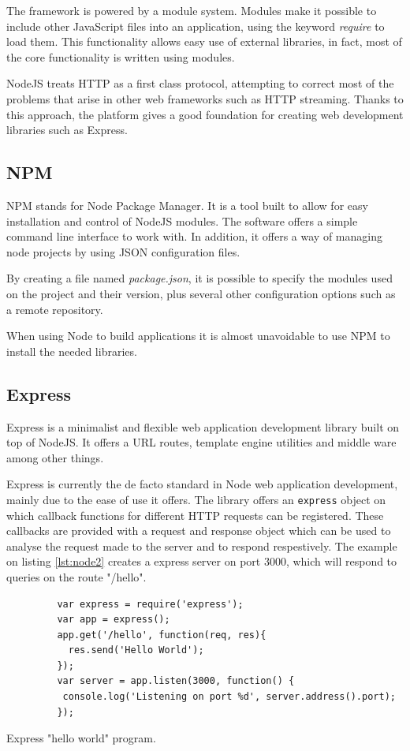 The framework is powered by a module system. Modules make it possible to include other JavaScript files into an application, using the keyword \textit{require} to load them. This functionality allows easy use of external libraries, in fact, most of the core functionality is written using modules.

NodeJS treats HTTP as a first class protocol, attempting to correct most of the problems that arise in other web frameworks such as HTTP streaming. Thanks to this approach, the platform gives a good foundation for creating web development libraries such as Express.

\subsection*{NPM}

NPM stands for Node Package Manager. It is a tool built to allow for easy installation and control of NodeJS modules. The software offers a simple command line interface to work with. In addition, it offers a way of managing node projects by using JSON configuration files.

By creating a file named \textit{package.json}, it is possible to specify the modules used on the project and their version, plus several other configuration options such as a remote repository.

When using Node to build applications it is almost unavoidable to use NPM to install the needed libraries.

\subsection*{Express}

Express is a minimalist and flexible web application development library built on top of NodeJS. It offers a URL routes, template engine utilities and middle ware among other things. 

Express is currently the de facto standard in Node web application development, mainly due to the ease of use it offers. The library offers an \texttt{express} object on which callback functions for different HTTP requests can be registered. These callbacks are provided with a request and response object which can be used to analyse the request made to the server and to respond respestively. The example on listing \ref{lst:node2} creates a express server on port 3000, which will respond to queries on the route "/hello".

\begin{listing}[ht]\centering
  \begin{minipage}{.6\textwidth}
    \begin{verbatim}
	     var express = require('express');
	     var app = express();
	     app.get('/hello', function(req, res){
	       res.send('Hello World');
	     });
	     var server = app.listen(3000, function() {
	      console.log('Listening on port %d', server.address().port);
	     });
    \end{verbatim}
  \end{minipage}
  \caption{Express "hello world" program.}\label{lst:node2}
\end{listing}

